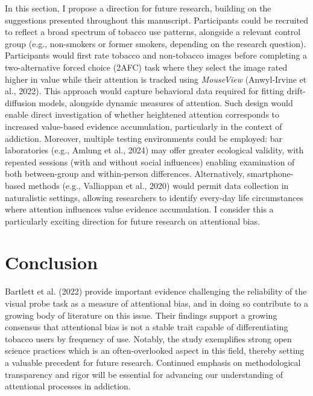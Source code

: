 \documentclass[authordate, empirical]{jote-new-article}
\begin{document}
	In this section, I propose a direction for future research, building on the suggestions presented throughout this manuscript. Participants could be recruited to reflect a broad spectrum of tobacco use patterns, alongside a relevant control group (e.g., non-smokers or former smokers, depending on the research question). Participants would first rate tobacco and non-tobacco images before completing a two-alternative forced choice (2AFC) task where they select the image rated higher in value while their attention is tracked using \emph{MouseView }(Anwyl-Irvine et al., 2022). This approach would capture behavioral data required for fitting drift-diffusion models, alongside dynamic measures of attention. Such design would enable direct investigation of whether heightened attention corresponds to increased value-based evidence accumulation, particularly in the context of addiction. Moreover, multiple testing environments could be employed: bar laboratories (e.g., Amlung et al., 2024) may offer greater ecological validity, with repeated sessions (with and without social influences) enabling examination of both between-group and within-person differences. Alternatively, smartphone-based methods (e.g., Valliappan et al., 2020) would permit data collection in naturalistic settings, allowing researchers to identify every-day life circumstances where attention influences value evidence accumulation. I consider this a particularly exciting direction for future research on attentional bias.



	\section{Conclusion }



	Bartlett et al. (2022) provide important evidence challenging the reliability of the visual probe task as a measure of attentional bias, and in doing so contribute to a growing body of literature on this issue. Their findings support a growing consensus that attentional bias is not a stable trait capable of differentiating tobacco users by frequency of use. Notably, the study exemplifies strong open science practices which is an often-overlooked aspect in this field, thereby setting a valuable precedent for future research. Continued emphasis on methodological transparency and rigor will be essential for advancing our understanding of attentional processes in addiction.
\end{document}
